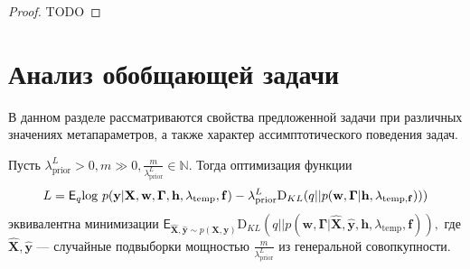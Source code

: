 \begin{proof}
TODO
\end{proof}

\section{Анализ обобщающей задачи}
В данном разделе рассматриваются свойства предложенной задачи при различных значениях метапараметров, а также характер ассимптотического поведения задач.

\begin{theorem}
Пусть ${\lambda_\text{prior}^L} > 0, m \gg 0, \frac{m}{\lambda_\text{prior}^L} \in \mathbb{N}.$ Тогда оптимизация функции
\[
L = 
{\mathsf{E}_q \text{log}~{p(\mathbf{y} | \mathbf{X}, \mathbf{w}, \boldsymbol{\Gamma}, \mathbf{h}, \lambda_{\text{temp}},\mathbf{f})}} - {\lambda_\text{prior}^L\text{D}_{KL}(q||p(\mathbf{w}, \boldsymbol{\Gamma} |\mathbf{h}, \lambda_{\text{temp}, \mathbf{f}})))}\vspace{-0.2cm}
\] эквивалентна минимизации $\mathsf{E}_{\hat{\mathbf{X}}, \hat{\mathbf{y}}\sim p(\mathbf{X}, \mathbf{y})}\text{D}_{KL}(q||p(\mathbf{w}, \boldsymbol{\Gamma} | \hat{\mathbf{X}}, \hat{\mathbf{y}},\mathbf{h},\lambda_{\text{temp}},\mathbf{f})),$ где $\hat{\mathbf{X}}, \hat{\mathbf{y}}$ --- случайные подвыборки мощностью $\frac{m}{{\lambda_\text{prior}^L}}$ из генеральной совопкупности.

\end{theorem}
